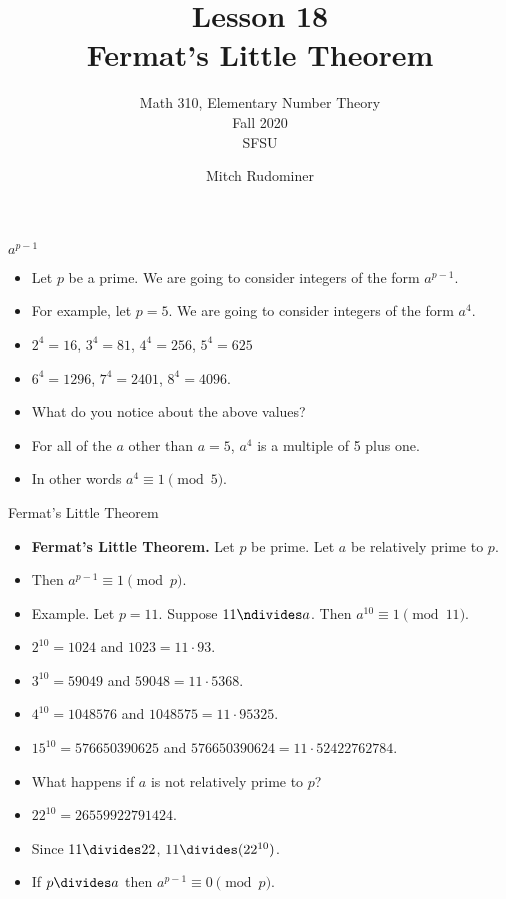 \documentclass{beamer}
\title{Lesson 18 \\ Fermat's Little Theorem}
\subtitle{Math 310, Elementary Number Theory \\ Fall 2020 \\ SFSU}
\author{Mitch Rudominer}
\date{}
\begin{document}
\begin{frame}
  \titlepage
\end{frame}

\begin{frame}{$a^{p-1}$}

\begin{itemize}
  \item Let $p$ be a prime. We are going to consider integers of the form $a^{p-1}$.
  \item For example, let $p=5$. We are going to consider integers of the form $a^4$.
  \item $2^4=16$, $3^4=81$, $4^4=256$, $5^4=625$
  \item $6^4=1296$,  $7^4=2401$, $8^4=4096$.
  \item What do you notice about the above values?
  \item For all of the $a$ other than $a=5$, $a^4$ is a multiple of 5 plus one.
  \item In other words $a^4 \equiv 1 \pmod 5$.
\end{itemize}

\end{frame}

\begin{frame}{Fermat's Little Theorem}

\begin{itemize}
  \item \textbf{Fermat's Little Theorem.} Let $p$ be prime. Let $a$ be relatively prime to $p$.
  \item Then $a^{p-1} \equiv 1 \pmod p$.
  \item Example. Let $p=11$. Suppose $11\ndivides a$. Then $a^{10} \equiv 1 \pmod {11}$.
  \item $2^{10} = 1024$ and $1023 = 11 \cdot 93$.
  \item $3^{10} = 59049$ and $59048 = 11 \cdot 5368$.
  \item $4^{10} = 1048576$ and $1048575 = 11 \cdot 95325$.
  \item $15^{10} = 576650390625$ and  $576650390624 = 11 \cdot 52422762784$.
  \item What happens if $a$ is not relatively prime to $p$?
  \item $22^{10} = 26559922791424$.
  \item Since $11\divides 22$, $11\divides (22^{10})$.
  \item If $p\divides a$ then $a^{p-1} \equiv 0 \pmod p$.
\end{itemize}

\end{frame}
\end{document}
